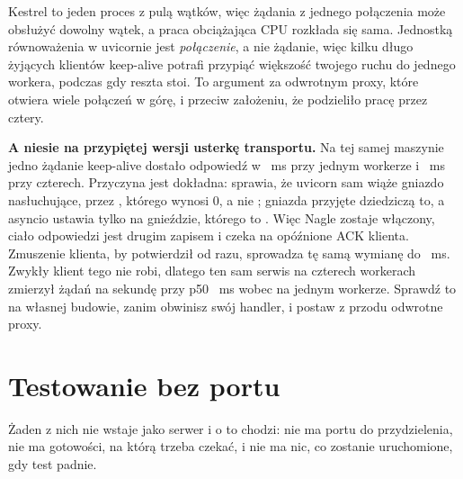 
\begin{csbox}
Kestrel to jeden proces z pulą wątków, więc żądania z jednego połączenia może
obsłużyć dowolny wątek, a praca obciążająca CPU rozkłada się sama. Jednostką
równoważenia w uvicornie jest \emph{połączenie}, a nie żądanie, więc kilku
długo żyjących klientów keep-alive potrafi przypiąć większość twojego ruchu do
jednego workera, podczas gdy reszta stoi. To argument za odwrotnym proxy,
które otwiera wiele połączeń w górę, i przeciw założeniu, że
 podzieliło pracę przez cztery.
\end{csbox}

\begin{versionbox}
\textbf{A  niesie na przypiętej wersji usterkę transportu.} Na
tej samej maszynie jedno żądanie keep-alive dostało odpowiedź w
~ms przy jednym workerze i ~ms przy
czterech. Przyczyna jest dokładna:  sprawia, że uvicorn sam
wiąże gniazdo nasłuchujące, przez ,
którego  wynosi 0, a nie ; gniazda przyjęte
dziedziczą to, a asyncio ustawia  tylko na gnieździe,
którego  to . Więc Nagle zostaje włączony,
ciało odpowiedzi jest drugim zapisem i czeka na opóźnione ACK klienta.
Zmuszenie klienta, by potwierdził od razu, sprowadza tę samą wymianę do
~ms. Zwykły klient tego nie robi, dlatego ten sam
serwis na czterech workerach zmierzył  żądań na
sekundę przy p50 ~ms wobec
 na jednym workerze. Sprawdź to na własnej
budowie, zanim obwinisz swój handler, i postaw z przodu odwrotne proxy.
\end{versionbox}

\section{Testowanie bez portu}
\label{sec:ch09-testing}

Żaden z nich nie wstaje jako serwer i o to chodzi: nie ma portu do
przydzielenia, nie ma gotowości, na którą trzeba czekać, i nie ma nic, co
zostanie uruchomione, gdy test padnie.


